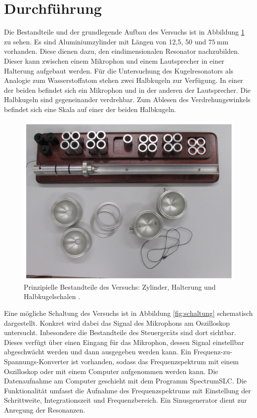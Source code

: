 \section{Durchführung}
\label{sec:Durchführung}
Die Bestandteile und der grundlegende Aufbau des Versuchs ist in Abbildung \ref{fig:grundlegenderAufbau} zu sehen. Es sind Aluminiumzylinder mit Längen von 12,5, 50 und $\SI{75}{\milli\meter}$ vorhanden. Diese dienen dazu, den eindimensionalen Resonator nachzubilden. Dieser kann zwischen einem Mikrophon und einem Lautsprecher in einer Halterung aufgebaut werden. Für die Untersuchung des Kugelresonators als Analogie zum Wasserstoffatom stehen zwei Halbkugeln zur Verfügung. In einer der beiden befindet sich ein Mikrophon und in der anderen der Lautsprecher. Die Halbkugeln sind gegeneinander verdrehbar. Zum
Ablesen des Verdrehungswinkels befindet sich eine Skala auf einer der beiden Halbkugeln.\\

\begin{figure}
  \centering
  \includegraphics[width=\textwidth]{data/aufbau.png}
  \caption{Prinzipielle Bestandteile des Versuchs: Zylinder, Halterung und Halbkugelschalen \cite{Versuchsanleitung}.}
  \label{fig:grundlegenderAufbau}
\end{figure}
Eine mögliche Schaltung des Versuchs ist in Abbildung \ref{fig:schaltung} schematisch dargestellt. Konkret wird dabei das Signal des Mikrophons am Oszilloskop untersucht. Inbesondere die Bestandteile des Steuergeräts sind dort sichtbar.
Dieses verfügt über einen Eingang für das Mikrophon, dessen Signal einstellbar abgeschwächt werden und dann ausgegeben werden kann. Ein Frequenz-zu-Spannungs-Konverter ist vorhanden, sodass das Frequenzspektrum mit einem Oszilloskop oder mit einem Computer aufgenommen werden kann. Die Datenaufnahme am Computer geschieht mit dem Programm SpectrumSLC. Die Funktionalität umfasst die Aufnahme des Frequenzspektrums mit Einstellung der Schrittweite, Integrationszeit und Frequenzbereich. Ein Sinusgenerator dient zur Anregung der Resonanzen.\\

